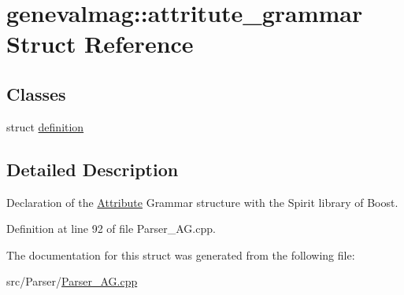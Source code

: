 \hypertarget{structgenevalmag_1_1attritute__grammar}{
\section{genevalmag::attritute\_\-grammar Struct Reference}
\label{structgenevalmag_1_1attritute__grammar}
}
\subsection*{Classes}
\begin{DoxyCompactItemize}
\item 
struct \hyperlink{structgenevalmag_1_1attritute__grammar_1_1definition}{definition}
\end{DoxyCompactItemize}


\subsection{Detailed Description}
Declaration of the \hyperlink{classgenevalmag_1_1Attribute}{Attribute} Grammar structure with the Spirit library of Boost. 

Definition at line 92 of file Parser\_\-AG.cpp.



The documentation for this struct was generated from the following file:\begin{DoxyCompactItemize}
\item 
src/Parser/\hyperlink{Parser__AG_8cpp}{Parser\_\-AG.cpp}\end{DoxyCompactItemize}
